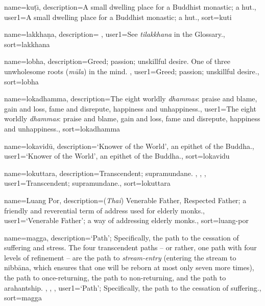 {
name=ku\d{t}\={\i},
description={A small dwelling place for a Buddhist monastic; a hut.},
user1={A small dwelling place for a Buddhist monastic; a hut.},
sort={kuti}
}

{
name={lakkha\d{n}a},
description={\nopostdesc \protect \seepre %
\protect {}%
\protect \seepost %
},
user1={See \textit{tilakkhana} in the Glossary.},
sort={lakkhana}
}

{
name={lobha},
description={Greed; passion; unskillful desire. One of three unwholesome roots (\textit{m\=ula}) in the mind. \protect \seepre %
\protect {}%
\protect \seepost %
},
user1={Greed; passion; unskillful desire.},
sort={lobha}
}

{
name=lokadhamma,
description={The eight worldly \textit{dhammas}: praise and blame, gain and loss, fame and disrepute, happiness and unhappiness.},
user1={The eight worldly \textit{dhammas}: praise and blame, gain and loss, fame and disrepute, happiness and unhappiness.},
sort={lokadhamma}
}

{
name=lokavid\=u,
description={`Knower of the World', an epithet of the Buddha.},
user1={`Knower of the World', an epithet of the Buddha.},
sort={lokavidu}
}

{
name={lokuttara},
description={Transcendent; supramundane. \protect \seepre %
\protect {}, \protect {}, \protect {}%
\protect \seepost %
},
user1={Transcendent; supramundane.},
sort={lokuttara}
}

{
name={Luang Por},
description={(\textit{Thai}) Venerable Father, Respected Father; a friendly and reverential term of address used for elderly monks.},
user1={`Venerable Father'; a way of addressing elderly monks.},
sort={luang-por}
}

{
name={magga},
description={`Path'; Specifically, the path to the cessation of suffering and stress. The four transcendent paths -- or rather, one path with four levels of refinement -- are the path to \textit{stream-entry} (entering the stream to nibb\=ana, which ensures that one will be reborn at most only seven more times), the path to once-returning, the path to non-returning, and the path to arahantship. \protect \seepre %
\protect {}, \protect {}, \protect {}%
\protect \seepost %
},
user1={`Path'; Specifically, the path to the cessation of suffering.},
sort={magga}
}

